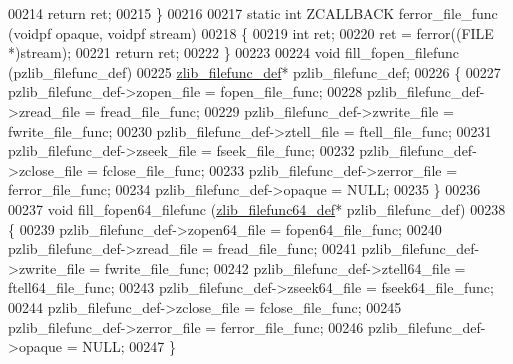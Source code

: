 \begin{DoxyCode}
00214     \textcolor{keywordflow}{return} ret;
00215 \}
00216 
00217 \textcolor{keyword}{static} \textcolor{keywordtype}{int} ZCALLBACK ferror\_file\_func (voidpf opaque, voidpf stream)
00218 \{
00219     \textcolor{keywordtype}{int} ret;
00220     ret = ferror((FILE *)stream);
00221     \textcolor{keywordflow}{return} ret;
00222 \}
00223 
00224 \textcolor{keywordtype}{void} fill\_fopen\_filefunc (pzlib\_filefunc\_def)
00225   \hyperlink{structzlib__filefunc__def__s}{zlib\_filefunc\_def}* pzlib\_filefunc\_def;
00226 \{
00227     pzlib\_filefunc\_def->zopen\_file = fopen\_file\_func;
00228     pzlib\_filefunc\_def->zread\_file = fread\_file\_func;
00229     pzlib\_filefunc\_def->zwrite\_file = fwrite\_file\_func;
00230     pzlib\_filefunc\_def->ztell\_file = ftell\_file\_func;
00231     pzlib\_filefunc\_def->zseek\_file = fseek\_file\_func;
00232     pzlib\_filefunc\_def->zclose\_file = fclose\_file\_func;
00233     pzlib\_filefunc\_def->zerror\_file = ferror\_file\_func;
00234     pzlib\_filefunc\_def->opaque = NULL;
00235 \}
00236 
00237 \textcolor{keywordtype}{void} fill\_fopen64\_filefunc (\hyperlink{structzlib__filefunc64__def__s}{zlib\_filefunc64\_def}*  pzlib\_filefunc\_def)
00238 \{
00239     pzlib\_filefunc\_def->zopen64\_file = fopen64\_file\_func;
00240     pzlib\_filefunc\_def->zread\_file = fread\_file\_func;
00241     pzlib\_filefunc\_def->zwrite\_file = fwrite\_file\_func;
00242     pzlib\_filefunc\_def->ztell64\_file = ftell64\_file\_func;
00243     pzlib\_filefunc\_def->zseek64\_file = fseek64\_file\_func;
00244     pzlib\_filefunc\_def->zclose\_file = fclose\_file\_func;
00245     pzlib\_filefunc\_def->zerror\_file = ferror\_file\_func;
00246     pzlib\_filefunc\_def->opaque = NULL;
00247 \}
\end{DoxyCode}
